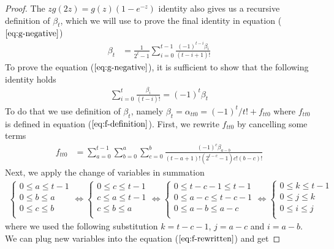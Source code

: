 \documentclass{article}
\begin{document}
\begin{proof}
The $zg(2z)=g(z)(1-e^{-z})$ identity also gives us a recursive definition of $\beta_t$, which we will use to prove the final identity in equation ($\ref{eq:g-negative}$)
\begin{align}
\label{eq:beta-recur}
\beta_{t} 
&=
\frac{1}{2^t-1}
\sum_{i=0}^{t-1}
  \frac{(-1)^{t-i} \beta_{i}}{(t-i+1)!}
\end{align}
To prove the equation ($\ref{eq:g-negative}$), it is sufficient to show that the following identity holds
\begin{align}
    \label{eq:alternative-beta-sign}
    \sum_{i=0}^{t} \frac{\beta_{i}}{(t-i)!} = (-1)^t \beta_t
\end{align}
To do that we use definition of $\beta_t$, namely $\beta_t = \alpha_{tt0} = (-1)^t/t! + f_{tt0}$ where $f_{tt0}$ is defined in equation ($\ref{eq:f-definition}$). First, we rewrite $f_{tt0}$ by cancelling some terms
\begin{align}
\label{eq:f-rewritten}
f_{tt0}
&=
  \sum_{a=0}^{t-1}
    \sum_{b=0}^{a}
      \sum_{c=0}^{b}
        \frac{(-1)^{c} \beta_{a-b}}
             {(t-a+1)!(2^{t-c}-1)c!(b-c)!}
\end{align}
Next, we apply the change of variables in summation
\begin{align*}
\begin{cases}
    0 \le a \le t-1\\
    0 \le b \le a\\
    0 \le c \le b\\
\end{cases}
\Longleftrightarrow
\begin{cases}
    0 \le c \le t-1\\
    c \le a \le t-1\\
    c \le b \le a\\
\end{cases}
\Longleftrightarrow
\begin{cases}
    0 \le t-c-1 \le t-1\\
    0 \le a-c \le t-c-1\\
    0 \le a-b \le a-c\\
\end{cases}
\Longleftrightarrow
\begin{cases}
    0 \le k \le t-1\\
    0 \le j \le k\\
    0 \le i \le j\\
\end{cases}
\end{align*}
where we used the following substitution $k=t-c-1$, $j=a-c$ and $i=a-b$. We can plug new variables into the equation ($\ref{eq:f-rewritten}$) and get

\end{proof}
\end{document}
